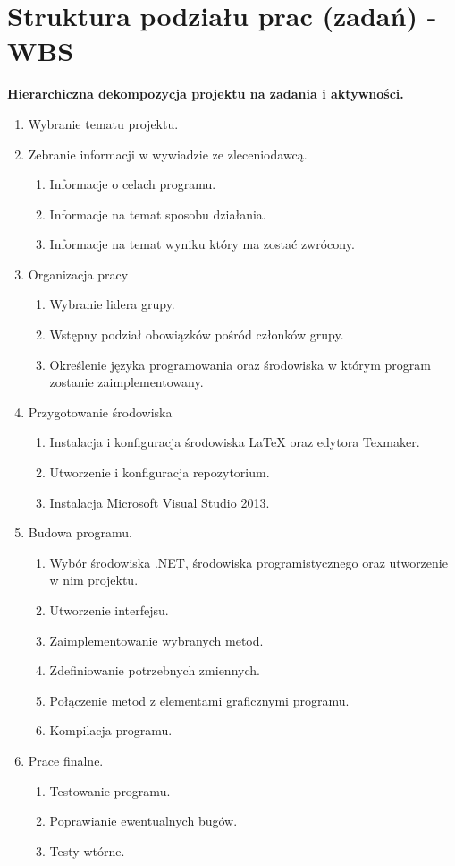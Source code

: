 \section{Struktura podziału prac (zadań) - WBS}
\textbf{Hierarchiczna dekompozycja projektu na zadania i aktywności.}
\begin{enumerate}
\item{Wybranie tematu projektu.}
\item Zebranie informacji w wywiadzie ze zleceniodawcą.
\begin{enumerate}
\item Informacje o celach programu.
\item Informacje na temat sposobu działania.
\item Informacje na temat wyniku który ma zostać zwrócony. 
\end{enumerate}
\item{Organizacja pracy}
\begin{enumerate}
\item Wybranie lidera grupy.
\item Wstępny podział obowiązków pośród członków grupy.
\item Określenie języka programowania oraz środowiska w którym program zostanie zaimplementowany.
\end{enumerate}
\item Przygotowanie środowiska
\begin{enumerate}
\item Instalacja i konfiguracja środowiska LaTeX oraz edytora Texmaker.
\item Utworzenie i konfiguracja repozytorium.
\item Instalacja Microsoft Visual Studio 2013.
\end{enumerate}
\item Budowa programu.
\begin{enumerate}
\item Wybór środowiska .NET, środowiska programistycznego oraz utworzenie w nim projektu.
\item Utworzenie interfejsu.
\item Zaimplementowanie wybranych metod.
\item Zdefiniowanie potrzebnych zmiennych.
\item Połączenie metod z elementami graficznymi programu.
\item Kompilacja programu.
\end{enumerate} 
\item Prace finalne.
\begin{enumerate}
\item Testowanie programu.
\item Poprawianie ewentualnych bugów.
\item Testy wtórne.
\end{enumerate}

\end{enumerate}


